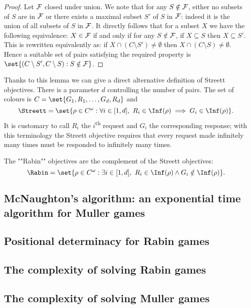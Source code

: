 \begin{proof}
Let $\mathcal{F}$ closed under union.
We note that for any $S \notin \mathcal{F}$, either no subsets of $S$ are in $\mathcal{F}$ or there exists a maximal subset $S'$ of $S$ in $\mathcal{F}$:
indeed it is the union of all subsets of $S$ in $\mathcal{F}$.
It directly follows that for a subset $X$ we have the following equivalence:
$X \in \mathcal{F}$ if and only if for any $S \notin \mathcal{F}$, if $X \subseteq S$ then $X \subseteq S'$.
This is rewritten equivalently as: if $X \cap (C \setminus S') \neq \emptyset$ then $X \cap (C \setminus S) \neq \emptyset$.
Hence a suitable set of pairs satisfying the required property is 
$\set{(C \setminus S', C \setminus S) : S \notin \F}$.
\end{proof}
Thanks to this lemma we can give a direct alternative definition of Streett objectives.
There is a parameter $d$ controlling the number of pairs.
The set of colours is $C = \set{G_1,R_1,\dots,G_d,R_d}$ and
\[
\Streett = \set{ \rho \in C^\omega : \forall i \in [1,d],\ R_i \in \Inf(\rho) \implies G_i \in \Inf(\rho) }.
\]
It is customary to call $R_i$ the $i$\textsuperscript{th} request and $G_i$ the corresponding response;
with this terminology the Streett objective requires that every request made infinitely many times must be responded to infinitely many times.

The ""Rabin"" objectives are the complement of the Streett objectives: 
\[
\Rabin = \set{ \rho \in C^\omega : \exists i \in [1,d],\ R_i \in \Inf(\rho) \wedge G_i \notin \Inf(\rho) }.
\]

\subsection*{McNaughton's algorithm: an exponential time algorithm for Muller games}


\subsection*{Positional determinacy for Rabin games}


\subsection*{The complexity of solving Rabin games}


\subsection*{The complexity of solving Muller games}    


